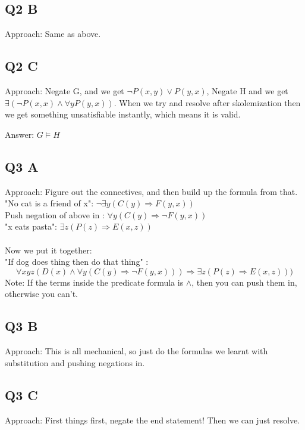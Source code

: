 \documentclass[12pt]{article}
\newcommand{\impl}{\mathbin{\Rightarrow}}
\begin{document}
\subsection*{Q2 B}

Approach: Same as above.

\subsection*{Q2 C}

Approach: Negate G, and we get $\neg P(x, y) \lor P(y, x)$, Negate H and we get $\exists (\neg P(x, x) \land \forall y P(y, x))$. When we try and resolve after skolemization then we get something unsatisfiable instantly, which means it is valid.

Answer: $G \models H$

\subsection*{Q3 A}

Approach: Figure out the connectives, and then build up the formula from that.\\
"No cat is a friend of x": $\neg\exists y(C(y) \impl F(y, x))$ \\
Push negation of above in : $\forall y(C(y) \impl \neg F(y, x))$ \\
"x eats pasta": $\exists z(P(z) \impl E(x,z))$ \\\\
Now we put it together:\\
"If dog does thing then do that thing" : $$\forall xyz (D(x) \land \forall y(C(y) \impl \neg F(y, x))) \impl \exists z(P(z) \impl E(x,z)))$$
Note: If the terms inside the predicate formula is $\land$, then you can push them in, otherwise you can't.\\

\subsection*{Q3 B}

Approach: This is all mechanical, so just do the formulas we learnt with substitution and pushing negations in.

\subsection*{Q3 C}

Approach: First things first, negate the end statement! Then we can just resolve.\\
\end{document}
